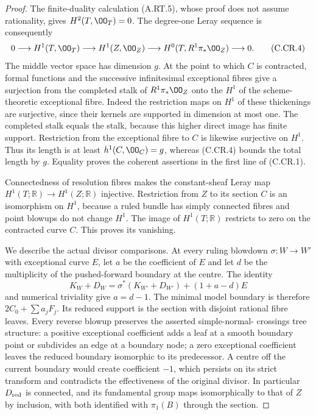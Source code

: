\begin{proof}
The finite-duality calculation (A.RT.5), whose proof does
not assume rationality, gives $H^2(T,\OO_T)=0$. The
degree-one Leray sequence is consequently
\[
 0\longrightarrow H^1(T,\OO_T)\longrightarrow H^1(Z,\OO_Z)
 \longrightarrow H^0(T,R^1\pi_*\OO_Z)\longrightarrow0.
\tag{C.CR.4}
\]
The middle vector space has dimension $g$. At the point
to which $C$ is contracted, formal functions and the
successive infinitesimal exceptional fibres give a
surjection from the completed stalk of $R^1\pi_*\OO_Z$
onto the $H^1$ of the scheme-theoretic exceptional fibre.
Indeed the restriction maps on $H^1$ of these thickenings
are surjective, since their kernels are supported in
dimension at most one. The completed stalk equals the
stalk, because this higher direct image has finite support.
Restriction from the exceptional fibre to $C$ is likewise
surjective on $H^1$. Thus its length is at least
$h^1(C,\OO_C)=g$, whereas (C.CR.4) bounds the total length
by $g$. Equality proves the coherent assertions in the
first line of (C.CR.1).

Connectedness of resolution fibres makes the constant-sheaf
Leray map $H^1(T;\mathbb R)\to H^1(Z;\mathbb R)$ injective.
Restriction from $Z$ to its section $C$ is an isomorphism
on $H^1$, because a ruled bundle has simply connected
fibres and point blowups do not change $H^1$. The image of
$H^1(T;\mathbb R)$ restricts to zero on the contracted
curve $C$. This proves its vanishing.

We describe the actual divisor comparisons. At every ruling
blowdown $\sigma:W\to W'$ with exceptional curve $E$, let
$a$ be the coefficient of $E$ and let $d$ be the multiplicity
of the pushed-forward boundary at the centre. The identity
\[
 K_W+D_W=\sigma^*(K_{W'}+D_{W'})+(1+a-d)E
\tag{C.CR.5}
\]
and numerical triviality give $a=d-1$. The minimal model
boundary is therefore $2C_0+\sum a_jF_j$. Its reduced
support is the section with disjoint rational fibre leaves.
Every reverse blowup preserves the asserted simple-normal-
crossings tree structure: a positive exceptional coefficient
adds a leaf at a smooth boundary point or subdivides an edge
at a boundary node; a zero exceptional coefficient leaves
the reduced boundary isomorphic to its predecessor. A centre
off the current boundary would create coefficient $-1$,
which persists on its strict transform and contradicts the
effectiveness of the original divisor. In particular
$D_{\rm red}$ is connected, and its fundamental group maps
isomorphically to that of $Z$ by inclusion, with both
identified with $\pi_1(B)$ through the section.


\end{proof}
